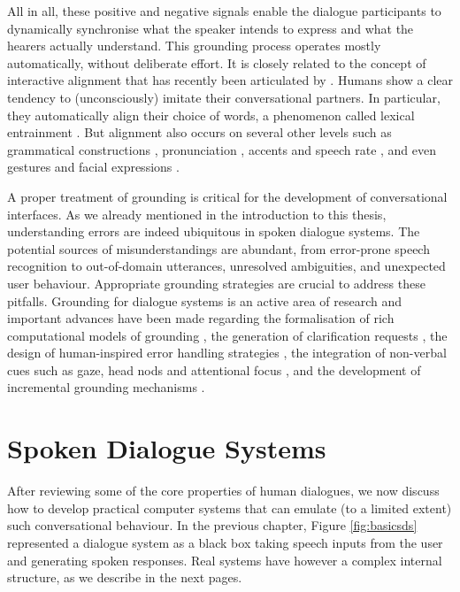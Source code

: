 All in all, these positive and negative signals enable the dialogue participants to dynamically synchronise what the speaker intends to express and what the hearers actually understand.   This grounding process operates mostly automatically, without deliberate effort.  It is closely related to the concept of interactive alignment that has recently been articulated by \cite{Garrod2004,Garrod2009}. Humans show a clear tendency to (unconsciously) imitate their conversational partners. In particular, they automatically align their choice of words, a phenomenon called lexical entrainment \citep{brennan1996conceptual}.  But alignment also occurs on several other levels such as grammatical constructions \citep{branigan2000syntactic}, pronunciation \citep{pardo2006phonetic}, accents and speech rate \citep{giles19911}, and even gestures and facial expressions \citep{bavelas1986show}.  

A proper treatment of grounding is critical for the development of conversational interfaces.  As we already mentioned in the introduction to this thesis, understanding errors are indeed ubiquitous in spoken dialogue systems.  The potential sources of misunderstandings are abundant, from error-prone speech recognition to out-of-domain utterances, unresolved ambiguities, and unexpected user behaviour.  Appropriate grounding strategies are crucial to address these pitfalls. Grounding for dialogue systems is an active area of research and important advances have been made regarding the formalisation of rich computational models of grounding \citep{Traum:1994thesis,MathesonPT00}, the generation of clarification requests \citep{Purver04Thesis,Rieser:2005}, the design of human-inspired error handling strategies \citep{Skantze2007}, the integration of non-verbal cues such as gaze, head nods and attentional focus \citep{Nakano:2003}, and the development of incremental grounding mechanisms \citep{visser_toward_2012}.

\section{Spoken Dialogue Systems}

After reviewing some of the core properties of human dialogues, we now discuss how to develop practical computer systems that can emulate (to a limited extent) such conversational behaviour.   In the previous chapter, Figure \ref{fig:basicsds} represented a dialogue system as a black box taking speech inputs from the user and generating spoken responses.   Real systems have however a complex internal structure, as we describe in the next pages.


